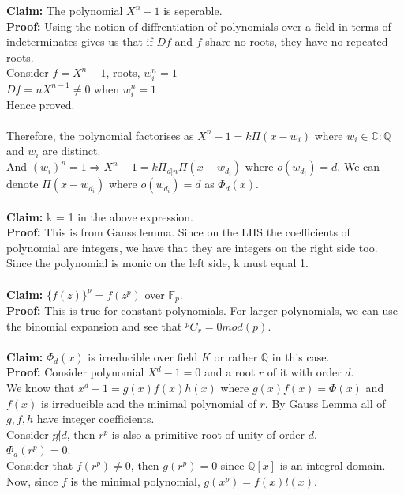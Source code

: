 \documentclass{article}
\begin{document}
\textbf{Claim:} The polynomial $X^n - 1$ is seperable. \\
\textbf{Proof:} Using the notion of diffrentiation of polynomials over a field in terms of indeterminates gives us that if $Df$ and $f$ share no roots, they have no repeated roots. \\
Consider $f = X^n - 1$, roots, $w_i^n = 1$ \\
$Df = nX^{n-1} \neq 0$ when  $w_i^n = 1$ \\
Hence proved. 
\\ \\
Therefore, the polynomial factorises as $X^n - 1 = k\Pi(x-w_i)$ where $w_i \in \mathbb{C}:\mathbb{Q}$ and $w_i$ are distinct. \\ 
And $(w_i)^n = 1 \Rightarrow X^n - 1 = k \Pi_{d|n}\Pi(x-w_{d_i})$ where $o(w_{d_i}) = d$.
We can denote $\Pi(x-w_{d_i})$ where $o(w_{d_i}) = d$ as $\Phi_d(x)$. \\ \\
\textbf{Claim:} k = 1 in the above expression. \\
\textbf{Proof:} This is from Gauss lemma. Since on the LHS the coefficients of polynomial are integers, we have that they are integers on the right side too. Since the polynomial is monic on the left side, k must equal 1. \\ \\
\textbf{Claim:} $\{f(z)\}^p = f(z^p)$ over $\mathbb{F}_p$. \\
\textbf{Proof:} This is true for constant polynomials. For larger polynomials, we can use the binomial expansion and see that $^pC_r = 0 mod (p)$. \\ \\
\textbf{Claim:} $\Phi_d(x)$ is irreducible over field $K$ or rather $\mathbb{Q}$ in this case. \\
\textbf{Proof:} Consider polynomial $X^d - 1 = 0$ and a root $r$ of it with order $d$.  \\
We know that $x^d - 1 = g(x)f(x)h(x)$ where $g(x)f(x) = \Phi(x)$ and $f(x)$ is irreducible and the minimal polynomial of $r$. By Gauss Lemma all of $g,f,h$ have integer coefficients. \\ 
Consider $p \not | d$, then $r^p$ is also a primitive root of unity of order $d$. \\
$\Phi_d(r^p) = 0$. \\
Consider that $f(r^p) \neq 0$, then $g(r^p) = 0$ since $\mathbb{Q}[x]$ is an integral domain. \\
Now, since $f$ is the minimal polynomial, $g(x^p) = f(x)l(x)$. \\
\end{document}

